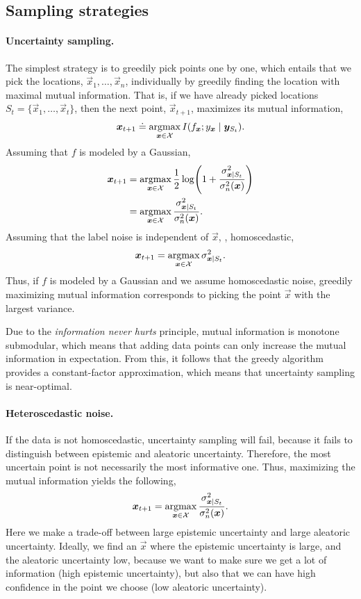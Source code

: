 \subsection{Sampling strategies}

\paragraph{Uncertainty sampling.}

The simplest strategy is to greedily pick points one by one, which entails
that we pick the locations, $\vec{x}_1,\ldots,\vec{x}_n$, individually by
greedily finding the location with maximal mutual information. That is, if we
have already picked locations $S_t = \{ \vec{x}_1,\ldots,\vec{x}_t \}$, then
the next point, $\vec{x}_{t+1}$, maximizes its mutual information, \[
  \bm{x}_{t+1} \doteq \operatorname*{argmax}_{\bm{x}\in\mathcal{X}} I(f_{\bm{x}};y_{\bm{x}}\mid\bm{y}_{S_t})
.\]
Assuming that $f$ is modeled by a Gaussian,
\begin{align*}
  \vec{x}_{t+1} &= \argmax_{\vec{x}\in\mathcal{X}} \frac{1}{2}\log\lft( 1+\frac{\sigma_{\vec{x}\mid S_t}^2}{\sigma_n^2(\vec{x})} \rgt) \\
  &= \argmax_{\vec{x}\in\X} \frac{\sigma^2_{\vec{x}\mid S_t}}{\sigma_n^2(\vec{x})}
.\end{align*}
Assuming that the label noise is independent of $\vec{x}$, \ie, homoscedastic,
\[
  \bm{x}_{t+1} = \operatorname*{argmax}_{\bm{x}\in\mathcal{X}} \sigma_{\bm{x}\mid S_t}^2
.\]
Thus, if $f$ is modeled by a Gaussian and we assume homoscedastic noise,
greedily maximizing mutual information corresponds to picking the point
$\vec{x}$ with the largest variance.

Due to the \textit{information never hurts} principle, mutual information is
monotone submodular, which means that adding data points can only increase
the mutual information in expectation. From this, it follows that the greedy
algorithm provides a constant-factor approximation, which means that
uncertainty sampling is near-optimal.

\paragraph{Heteroscedastic noise.}

If the data is not homoscedastic, uncertainty sampling will fail, because it
fails to distinguish between epistemic and aleatoric uncertainty. Therefore,
the most uncertain point is not necessarily the most informative one. Thus,
maximizing the mutual information yields the following, \[
  \bm{x}_{t+1} = \operatorname*{argmax}_{\bm{x}\in\mathcal{X}} \frac{\sigma_{\bm{x}\mid S_t}^2}{\sigma_n^2(\bm{x})}
.\]
Here we make a trade-off between large epistemic uncertainty and large
aleatoric uncertainty. Ideally, we find an $\vec{x}$ where the epistemic
uncertainty is large, and the aleatoric uncertainty low, because we want to
make sure we get a lot of information (high epistemic uncertainty), but also
that we can have high confidence in the point we choose (low aleatoric
uncertainty).

